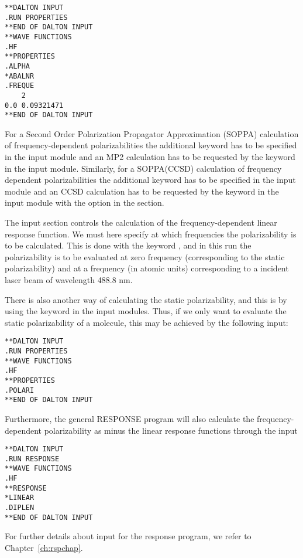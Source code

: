 \begin{verbatim}
**DALTON INPUT
.RUN PROPERTIES
**END OF DALTON INPUT
**WAVE FUNCTIONS
.HF
**PROPERTIES
.ALPHA
*ABALNR
.FREQUE
    2
0.0 0.09321471
**END OF DALTON INPUT
\end{verbatim}

For a Second Order Polarization Propagator Approximation (SOPPA)
\cite{esnpjjodjcp73,jopjdycpr2,mjpekdtehjajjojcp,ekdspasjpca102} calculation 
of frequency-dependent polarizabilities the additional keyword
 has to be  
specified in the  input module and an MP2 calculation has to 
be requested by the keyword  in the  input 
module. Similarly, for a SOPPA(CCSD)
\cite{soppaccsd,ekdspasjpca102} calculation of frequency
dependent polarizabilities the additional keyword  has to be 
specified in the  input module and an CCSD calculation has to 
be requested by the keyword  in the  input 
module with the option  in the  section.

The  input section controls the calculation of the
frequency-dependent linear response
function.
We must here specify at which frequencies the polarizability is
to be calculated. This is done with the keyword , and in
this run the polarizability is to be evaluated at zero frequency
(corresponding to the static polarizability) and at a frequency (in
atomic units) corresponding to a incident laser beam of wavelength
488.8 nm.

There is also another way of calculating the static
 polarizability, and this is by using the
keyword  in the  input modules. Thus, if we only
want to evaluate the static polarizability of a molecule, this may be
achieved by the following input:

\begin{verbatim}
**DALTON INPUT
.RUN PROPERTIES
**WAVE FUNCTIONS
.HF 
**PROPERTIES
.POLARI
**END OF DALTON INPUT
\end{verbatim}

Furthermore, the general RESPONSE program will also calculate the
frequency-dependent polarizability
as minus the linear response functions through the input


\begin{verbatim}
**DALTON INPUT
.RUN RESPONSE
**WAVE FUNCTIONS
.HF
**RESPONSE
*LINEAR
.DIPLEN
**END OF DALTON INPUT
\end{verbatim}
For further details about input for the response program, we refer
to Chapter~\ref{ch:rspchap}.
